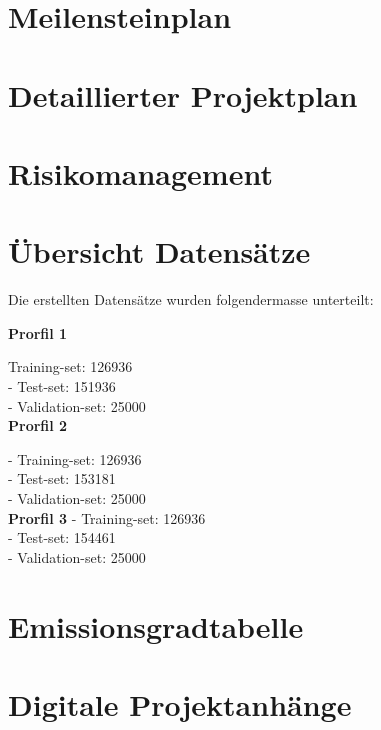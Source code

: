 \appendix

\chapter{Meilensteinplan}
\label{AnhangA}

\chapter{Detaillierter Projektplan}
\label{AnhangB}

\chapter{Risikomanagement}
\label{AnhangC}

\chapter{Übersicht Datensätze }
\label{AnhangD}

Die erstellten Datensätze wurden folgendermasse unterteilt:


\textbf{Prorfil 1}

Training-set:         126936 \\
- Test-set:             151936 \\
- Validation-set:       25000 \\


\textbf{Prorfil 2}

- Training-set:         126936 \\
- Test-set:             153181 \\
- Validation-set:       25000 \\

\textbf{Prorfil 3}
- Training-set:         126936 \\
- Test-set:             154461 \\ 
- Validation-set:       25000 \\


\chapter{Emissionsgradtabelle}
\label{AnhangE}





\chapter{Digitale Projektanhänge}
\label{AnhangDig}

